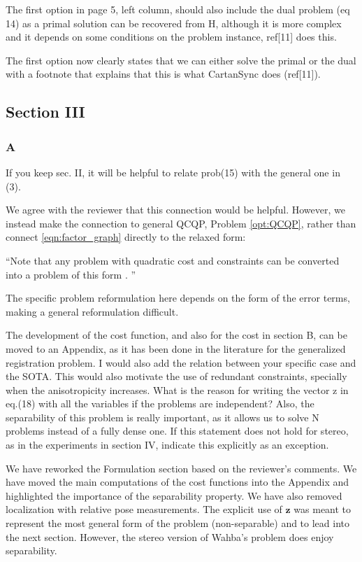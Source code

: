 The first option in page 5, left column, should also include the dual problem (eq 14) as a primal solution can be recovered from H, although it is more complex and it depends on some conditions on the problem instance, ref[11] does this. 
\begin{response}
    The first option now clearly states that we can either solve the primal or the dual with a footnote that explains that this is what CartanSync does (ref[11]).
\end{response}

\subsection*{ Section III }
\subsubsection*{A} 
If you keep sec. II, it will be helpful to relate prob(15) with the general one in (3). 
\begin{response}
    We agree with the reviewer that this connection would be helpful. However, we instead make the connection to general QCQP, Problem \ref{opt:QCQP}, rather than connect \eqref{eqn:factor_graph} directly to the relaxed form:

    ``Note that any problem with quadratic cost and constraints can be converted into a problem of this form \cite{cifuentesLocalStabilitySemidefinite2022}. ''

    The specific problem reformulation here depends on the form of the error terms, making a general reformulation difficult.

\end{response}

The development of the cost function, and also for the cost in section B, can be moved to an Appendix, as it has been done in the literature for the generalized registration problem.  I would also add the relation between your specific case and the SOTA. This would also motivate the use of redundant constraints, specially when the anisotropicity increases. What is the reason for writing the vector z in eq.(18) with all the variables if the problems are independent? Also, the separability of this problem is really important, as it allows us to solve N problems instead of  a fully dense one. If this statement does not hold for stereo, as in the experiments in section IV, indicate this explicitly as an exception. 
\begin{response}
    We have reworked the Formulation section based on the reviewer's comments. We have moved the main computations of the cost functions into the Appendix and highlighted the importance of the separability property. We have also removed localization with relative pose measurements. The explicit use of $\bm{z}$ was meant to represent the most general form of the problem (non-separable) and to lead into the next section. However, the stereo version of Wahba's problem does enjoy separability.
\end{response}

